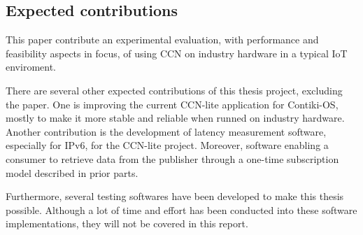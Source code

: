 \subsection{Expected contributions}
This paper contribute an experimental evaluation, with performance and feasibility aspects in focus, of using CCN on industry hardware in a typical IoT enviroment.

There are several other expected contributions of this thesis project, excluding the paper. One is improving the current CCN-lite application for Contiki-OS, mostly to make it more stable and reliable when runned on industry hardware. Another contribution is the development of latency measurement software, especially for IPv6, for the CCN-lite project. Moreover, software enabling a consumer to retrieve data from the publisher through a one-time subscription model described in prior parts.

Furthermore, several testing softwares have been developed to make this thesis possible. Although a lot of time and effort has been conducted into these software implementations, they will not be covered in this report.



